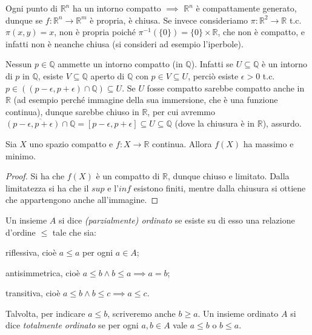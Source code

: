 \begin{ex}
  Ogni punto di $\mathbb{R}^n$ ha un intorno compatto $\implies$ $\mathbb{R}^n$ è compattamente generato, dunque se $f:\mathbb{R}^n \rightarrow \mathbb{R}^m$ è propria, è chiusa.
  Se invece consideriamo $\pi: \mathbb{R}^2 \rightarrow \mathbb{R}$ t.c. $\pi(x, y)=x$, non è propria poiché $\pi^{-1}(\{0\})=\{0\} \times \mathbb{R}$, che non è compatto, e infatti non è neanche chiusa (si consideri ad esempio l'iperbole).
\end{ex}

\begin{ex}
  Nessun $p \in \mathbb{Q}$ ammette un intorno compatto (in $\mathbb{Q}$). Infatti se $U \subseteq \mathbb{Q}$ è un intorno di $p$ in $\mathbb{Q}$, esiste $V \subseteq \mathbb{Q}$ aperto di $\mathbb{Q}$ con $p \in V \subseteq U$,
  perciò esiste $\epsilon>0$ t.c. $p \in ((p-\epsilon, p+\epsilon) \cap \mathbb{Q}) \subseteq U$. Se $U$ fosse compatto sarebbe compatto anche in $\mathbb{R}$ (ad esempio perché immagine della sua immersione, che è una funzione continua), dunque sarebbe chiuso in $\mathbb{R}$,
  per cui avremmo $\overline{(p-\epsilon, p+\epsilon) \cap \mathbb{Q}}=[p-\epsilon, p+\epsilon] \subseteq U \subseteq \mathbb{Q}$ (dove la chiusura è in $\mathbb{R}$), assurdo.
\end{ex}

\begin{thm}
Sia $X$ uno spazio compatto e $f:X\longrightarrow \mathbb{R}$ continua. Allora $f(X)$ ha massimo e minimo.
\end{thm}
\begin{proof}
Si ha che $f(X)$ \`e un compatto di $\mathbb{R}$, dunque chiuso e limitato. Dalla limitatezza si ha che il $sup$ e l'$inf$ esistono finiti, mentre dalla chiusura si ottiene che appartengono anche all'immagine.
\end{proof}

\begin{defn}
  Un insieme $A$ si dice \textit{(parzialmente) ordinato} se esiste su di esso una relazione d'ordine $\le$ tale che sia:
  \begin{nlist}
    \item riflessiva, cioè $a \le a$ per ogni $a \in A$;
    \item antisimmetrica, cioè $a \le b \land b \le a \implies a=b$;
    \item transitiva, cioè $a \le b \land b \le c \implies a \le c$.
  \end{nlist}
  Talvolta, per indicare $a \le b$, scriveremo anche $b \ge a$.
  Un insieme ordinato $A$ si dice \textit{totalmente ordinato} se per ogni $a, b \in A$ vale $a \le b$ o $b \le a$.
\end{defn}

